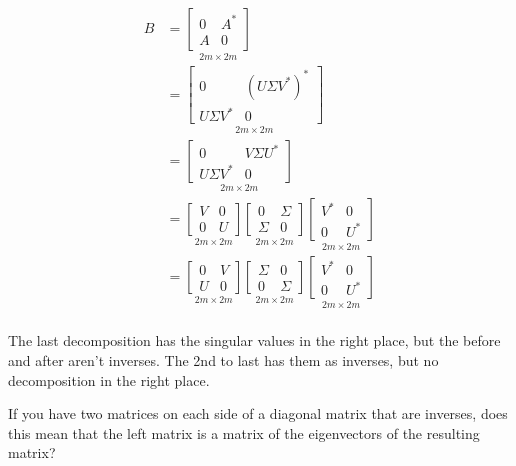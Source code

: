 \documentclass[12pt]{article}
\newcommand{\splt}[1]{\begin{split}#1\end{split}}
\begin{document}
\begin{displaymath}
\splt{
  B & = \underset{2m \times 2m}{
\begin{bmatrix}
   0 & A^* \\
   A & 0 
  \end{bmatrix}
} \\
& = \underset{2m \times 2m}{
\begin{bmatrix}
   0 & (U\Sigma V^*)^* \\
   U\Sigma V^* & 0 
  \end{bmatrix}
} \\ 
& = \underset{2m \times 2m}{
\begin{bmatrix}
   0 & V \Sigma U^* \\
   U\Sigma V^* & 0 
  \end{bmatrix}
} \\
& = \underset{2m \times 2m}{
\begin{bmatrix}
   V & 0 \\
   0 & U
  \end{bmatrix}
}
\underset{2m \times 2m}{
\begin{bmatrix}
   0 & \Sigma \\
   \Sigma & 0 
  \end{bmatrix}
}
\underset{2m \times 2m}{
\begin{bmatrix}
   V^* & 0\\
   0 & U^* 
  \end{bmatrix}
} \\ 
& = \underset{2m \times 2m}{
\begin{bmatrix}
   0 & V \\
   U & 0
  \end{bmatrix}
}
\underset{2m \times 2m}{
\begin{bmatrix}
   \Sigma & 0 \\
   0 & \Sigma  
  \end{bmatrix}
}
\underset{2m \times 2m}{
\begin{bmatrix}
   V^* & 0\\
   0 & U^* 
  \end{bmatrix}
} \\ 
}
\end{displaymath}

The last decomposition has the singular values in the right place, but the before and after aren't inverses. The 2nd to last has them as inverses, but no decomposition in the right place.

If you have two matrices on each side of a diagonal matrix that are inverses, does this mean that the left matrix is a matrix of the eigenvectors of the  resulting matrix?
\end{document}
